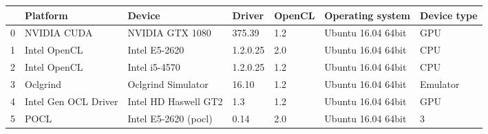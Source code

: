 \begin{tabular}{lllllll}
\toprule
{} &              Platform &                Device &    Driver & OpenCL &    Operating system & Device type \\
\midrule
0 &           NVIDIA CUDA &       NVIDIA GTX 1080 &    375.39 &    1.2 &  Ubuntu 16.04 64bit &         GPU \\
1 &          Intel OpenCL &         Intel E5-2620 &  1.2.0.25 &    2.0 &  Ubuntu 16.04 64bit &         CPU \\
2 &          Intel OpenCL &         Intel i5-4570 &  1.2.0.25 &    1.2 &  Ubuntu 16.04 64bit &         CPU \\
3 &              Oclgrind &    Oclgrind Simulator &     16.10 &    1.2 &  Ubuntu 16.04 64bit &    Emulator \\
4 &  Intel Gen OCL Driver &  Intel HD Haswell GT2 &       1.3 &    1.2 &  Ubuntu 16.04 64bit &         GPU \\
5 &                  POCL &  Intel E5-2620 (pocl) &      0.14 &    2.0 &  Ubuntu 16.04 64bit &           3 \\
\bottomrule
\end{tabular}
